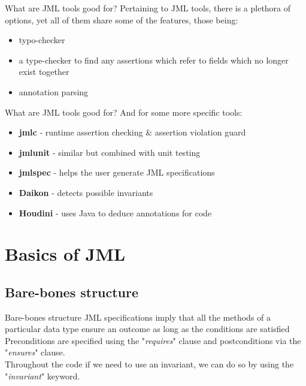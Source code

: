 \documentclass{beamer}
\begin{document}
\begin{frame}{What are JML tools good for?}
    Pertaining to JML tools, there is a plethora of options, yet all of them share some of the features, those being:
    \begin{itemize}
        \item typo-checker
        \item a type-checker to find any assertions which refer to fields which no longer exist together
        \item annotation parsing
    \end{itemize}
\end{frame}

\begin{frame}{What are JML tools good for?}
    And for some more specific tools:
    \begin{itemize}
        \item \textbf{jmlc} - runtime assertion checking \& assertion violation guard%
        \item \textbf{jmlunit} - similar but combined with unit testing%
        \item \textbf{jmlspec} - helps the user generate JML specifications%
        \item \textbf{Daikon} - detects possible invariants%
        \item \textbf{Houdini} - uses Java to deduce annotations for code
    \end{itemize}
\end{frame}

\section{Basics of JML}

\subsection{Bare-bones structure}



\begin{frame}{Bare-bones structure}
        JML specifications imply that all the methods of a particular data type ensure an outcome as long as the conditions are satisfied\\ \medskip%
        Preconditions are specified using the "\textit{requires}" clause and postconditions via the "\textit{ensures}" clause.\\ \medskip
        Throughout the code if we need to use an invariant, we can do so by using the "\textit{invariant}" keyword.\\ \medskip
        
\end{frame}
\end{document}
